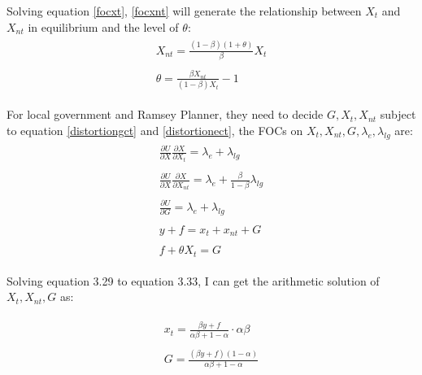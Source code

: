 Solving equation \ref{focxt}, \ref{focxnt} will generate the relationship between $X_t$ and $X_{nt}$ in equilibrium and the level of $\theta$:
\begin{align}
    \begin{split}
        X_{nt}=\frac{(1-\beta)(1+\theta)}{\beta}X_t \label{xtxnt}
    \end{split} \\
    \begin{split}
        \theta=\frac{\beta X_{n t}}{(1-\beta) X_t}-1 \label{theta}
    \end{split}
\end{align}

For local government and Ramsey Planner, they need to decide $G, X_t, X_{nt}$ subject to equation \ref*{distortiongct} and \ref*{distortionect}, the FOCs on $X_t, X_{nt}, G, \lambda_e, \lambda_{lg}$ are:
\begin{align}
    \begin{split}
        \frac{\partial U}{\partial X} \frac{\partial X}{\partial X_t}=\lambda_e+\lambda_{l g}
    \end{split}                                                      \\
    \begin{split}
        \frac{\partial U}{\partial X} \frac{\partial X}{\partial X_{nt}}=\lambda_e +\frac{\beta}{1-\beta} \lambda_{l g}
    \end{split} \\
    \begin{split}
        \frac{\partial U}{\partial G}=\lambda_e+\lambda_{l g}
    \end{split}                                                                                      \\
    \begin{split}
        y+f=x_t+x_{nt}+G
    \end{split}                                                                                                                           \\
    \begin{split}
        f+\theta X_t=G
    \end{split}
\end{align}

Solving equation 3.29 to equation 3.33, I can get the arithmetic solution of $X_t, X_{nt}, G$ as:

\begin{align}
    \begin{split}
        x_t=\frac{\beta y+f}{\alpha \beta+1-\alpha} \cdot \alpha \beta
    \end{split} \\
    \begin{split}
        G=\frac{(\beta y+f)(1-\alpha)}{\alpha \beta+1-\alpha}
    \end{split}
\end{align}

